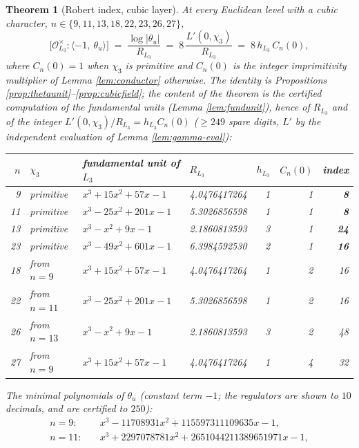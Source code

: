 \documentclass[11pt]{amsart}
\numberwithin{equation}{section}
\theoremstyle{plain}
\newtheorem{theorem}{Theorem}[section]
\theoremstyle{definition}
\theoremstyle{remark}
\newcommand{\Oc}{\mathcal{O}}
\begin{document}
\begin{theorem}[Robert index, cubic layer]\label{thm:robert}
At every Euclidean level with a cubic character, $n \in \{9, 11, 13, 18,
22, 23, 26, 27\}$,
\[
  \bigl[\Oc_{L_3}^\times : \langle -1,\ \theta_u\rangle\bigr]
  \;=\; \frac{\log|\theta_u|}{R_{L_3}}
  \;=\; 8\,\frac{L'(0,\chi_3)}{R_{L_3}}
  \;=\; 8\,h_{L_3}\,C_n(0),
\]
where $C_n(0) = 1$ when $\chi_3$ is primitive and $C_n(0)$ is the integer
imprimitivity multiplier of Lemma \ref{lem:conductor} otherwise.  The
identity is Propositions \ref{prop:thetaunit}--\ref{prop:cubicfield}; the
content of the theorem is the certified computation of the fundamental
units (Lemma \ref{lem:fundunit}), hence of $R_{L_3}$ and of the integer
$L'(0,\chi_3)/R_{L_3} = h_{L_3}C_n(0)$ ($\ge 249$ spare digits, $L'$ by
the independent evaluation of Lemma \ref{lem:gamma-eval}):
\begin{center}
\footnotesize
\setlength{\tabcolsep}{3.5pt}
\begin{tabular}{@{}rlllrrr@{}}
\toprule
$n$ & $\chi_3$ & fundamental unit of $L_3$ & $R_{L_3}$ & $h_{L_3}$ &
$C_n(0)$ & index\\
\midrule
9 & primitive & $x^3 + 15x^2 + 57x - 1$ & 4.0476417264 & 1 & 1 & \textbf{8}\\
11 & primitive & $x^3 - 25x^2 + 201x - 1$ & 5.3026856598 & 1 & 1 & \textbf{8}\\
13 & primitive & $x^3 - x^2 + 9x - 1$ & 2.1860813593 & 3 & 1 & \textbf{24}\\
23 & primitive & $x^3 - 49x^2 + 601x - 1$ & 6.3984592530 & 2 & 1 & \textbf{16}\\
18 & from $n = 9$ & $x^3 + 15x^2 + 57x - 1$ & 4.0476417264 & 1 & 2 & 16\\
22 & from $n = 11$ & $x^3 - 25x^2 + 201x - 1$ & 5.3026856598 & 1 & 2 & 16\\
26 & from $n = 13$ & $x^3 - x^2 + 9x - 1$ & 2.1860813593 & 3 & 2 & 48\\
27 & from $n = 9$ & $x^3 + 15x^2 + 57x - 1$ & 4.0476417264 & 1 & 4 & 32\\
\bottomrule
\end{tabular}
\end{center}
The minimal polynomials of $\theta_u$ (constant term $-1$; the
regulators are shown to $10$ decimals, and are certified to $250$):
{\footnotesize
\begin{align*}
n = 9:&\quad x^3 - 11708931x^2 + 115597311109635x - 1,\\
n = 11:&\quad x^3 + 2297078781x^2 + 2651044211389651971x - 1,\\

\end{align*}}
\end{theorem}
\end{document}
